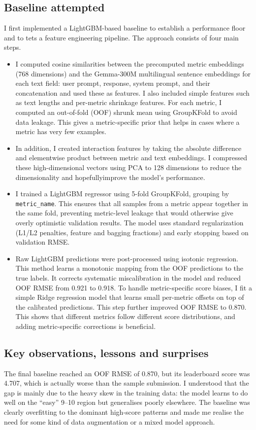 \documentclass[11pt]{article}
\begin{document}
\subsection{Baseline attempted}

\noindent I first implemented a LightGBM-based baseline to establish a performance floor and to tets a feature engineering pipeline. The approach consists of four main steps.

\begin{itemize}
    \item I computed cosine similarities between the precomputed metric embeddings (768 dimensions) and the Gemma-300M multilingual sentence embeddings for each text field: user prompt, response, system prompt, and their concatenation and used these as features. I also included simple features such as text lengths and per-metric shrinkage features. For each metric, I computed an out-of-fold (OOF) shrunk mean using GroupKFold to avoid data leakage. This gives a metric-specific prior that helps in cases where a metric has very few examples.  
    \item In addition, I created interaction features by taking the absolute difference and elementwise product between metric and text embeddings. I compressed these high-dimensional vectors using PCA to 128 dimensions to reduce the dimensionality and hopefullyimprove the model's performance.
    \item I trained a LightGBM regressor using 5-fold GroupKFold, grouping by \texttt{metric\_name}. This ensures that all samples from a metric appear together in the same fold, preventing metric-level leakage that would otherwise give overly optimistic validation results. The model uses standard regularization (L1/L2 penalties, feature and bagging fractions) and early stopping based on validation RMSE. 
    \item Raw LightGBM predictions were post-processed using isotonic regression. This method learns a monotonic mapping from the OOF predictions to the true labels. It corrects systematic miscalibration in the model and reduced OOF RMSE from 0.921 to 0.918. To handle metric-specific score biases, I fit a simple Ridge regression model that learns small per-metric offsets on top of the calibrated predictions. This step further improved OOF RMSE to 0.870. This shows that different metrics follow different score distributions, and adding metric-specific corrections is beneficial.
\end{itemize}


\subsection{Key observations, lessons and surprises}
The final baseline reached an OOF RMSE of 0.870, but its leaderboard score was 4.707, which is actually worse than the sample submission. I understood that the gap is mainly due to the heavy skew in the training data: the model learns to do well on the “easy” 9–10 region but generalises poorly elsewhere. The baseline was clearly overfitting to the dominant high-score patterns and made me realise the need for some kind of data augmentation or a mixed model approach.
\end{document}
